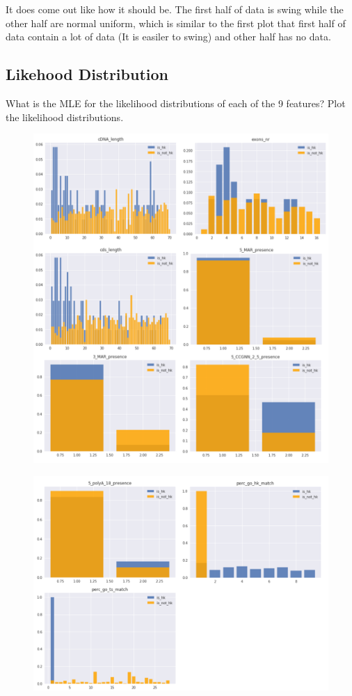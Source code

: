 \documentclass[12pt]{article}
\begin{document}
It does come out like how it should be. The first half of data is swing while the other half are normal uniform,
which is similar to the first plot that first half of data contain a lot of data (It is easiler to swing) and other half has no data.

\subsection{Likehood Distribution}

What is the MLE for the likelihood distributions of each of the 9 features? Plot
the likelihood distributions.

\begin{figure}[H]
  \centering
  \includegraphics[width=1\textwidth]{mle_1.png}
  \end{figure}

\begin{figure}[H]
  \centering
  \includegraphics[width=1\textwidth]{mle_2.png}
  \end{figure}
\end{document}
